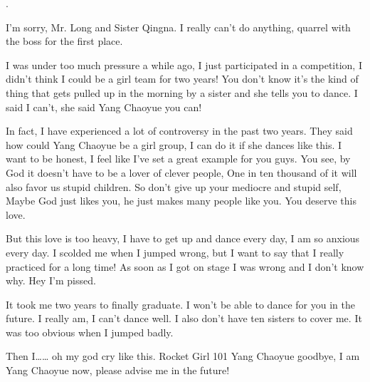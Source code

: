 \begin{englishabstract}
%
\engchptitleTwo.

I'm sorry, Mr. Long and Sister Qingna.
I really can't do anything, quarrel with the boss for the first place.

I was under too much pressure a while ago, I just participated in a competition, I didn't think I could be a girl team for two years!
You don't know it's the kind of thing that gets pulled up in the morning by a sister and she tells you to dance.
I said I can't, she said Yang Chaoyue you can!

In fact, I have experienced a lot of controversy in the past two years.
They said how could Yang Chaoyue be a girl group, I can do it if she dances like this.
I want to be honest, I feel like I've set a great example for you guys.
You see, by God it doesn't have to be a lover of clever people,
One in ten thousand of it will also favor us stupid children.
So don't give up your mediocre and stupid self,
Maybe God just likes you, he just makes many people like you.
You deserve this love.

But this love is too heavy, I have to get up and dance every day, I am so anxious every day.
I scolded me when I jumped wrong, but I want to say that I really practiced for a long time!
As soon as I got on stage I was wrong and I don't know why.
Hey I'm pissed.

It took me two years to finally graduate.
I won't be able to dance for you in the future.
I really am, I can't dance well.
I also don't have ten sisters to cover me.
It was too obvious when I jumped badly.

Then I……
oh my god cry like this.
Rocket Girl 101 Yang Chaoyue goodbye, I am Yang Chaoyue now, please advise me in the future!


%
\end{englishabstract}

\ifx\mainpage\undefined

\fi
